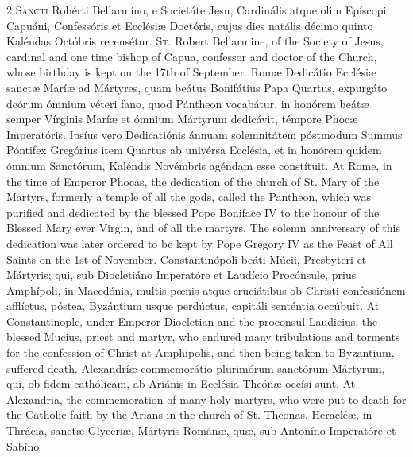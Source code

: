 \begin{paracol}{2}
\lettrine[lines=2]{S}{ancti} Robérti 
 Bellarmíno, e Societáte Jesu, Cardinális atque olim Epíscopi Capuáni, 
 Confessóris et Ecclésiæ Doctóris, cujus dies natális décimo quinto Kaléndas 
 Octóbris recensétur.
\switchcolumn
{}
\lettrine[lines=2]{S}{t.} Robert Bellarmine, of the 
 Society of Jesus, cardinal and one time bishop of Capua, confessor and 
 doctor of the Church, whose birthday is kept on the 17th of September.
\switchcolumn*
{}
Romæ Dedicátio 
 Ecclésiæ sanctæ Maríæ ad Mártyres, quam beátus Bonifátius Papa Quartus, 
 expurgáto deórum ómnium véteri fano, quod Pántheon vocabátur, in honórem 
 beátæ semper Vírginis Maríæ et ómnium Mártyrum dedicávit, témpore Phocæ 
 Imperatóris. Ipsíus vero Dedicatiónis ánnuam solemnitátem póstmodum 
 Summus Póntifex Gregórius item Quartus ab univérsa Ecclésia, et in honórem 
 quidem ómnium Sanctórum, Kaléndis Novémbris agéndam esse constítuit.
\switchcolumn
{}
At Rome, in the time of Emperor 
 Phocas, the dedication of the church of St. Mary of the Martyrs, formerly a 
 temple of all the gods, called the Pantheon, which was purified and 
 dedicated by the blessed Pope Boniface IV to the honour of the Blessed Mary 
 ever Virgin, and of all the martyrs. The solemn anniversary of this 
 dedication was later ordered to be kept by Pope Gregory IV as the Feast of 
 All Saints on the 1st of November.
\switchcolumn*
{}
Constantinópoli beáti 
 Múcii, Presbyteri et Mártyris; qui, sub Diocletiáno Imperatóre et Laudício 
 Procónsule, prius Amphípoli, in Macedónia, multis pœnis atque cruciátibus ob 
 Christi confessiónem afflíctus, póstea, Byzántium usque perdúctus, capitáli 
 senténtia occúbuit.
\switchcolumn
{}
At Constantinople, under Emperor 
 Diocletian and the proconsul Laudicius, the blessed Mucius, priest and 
 martyr, who endured many tribulations and torments for the confession of 
 Christ at Amphipolis, and then being taken to Byzantium, suffered death.
\switchcolumn*
{}
Alexandríæ 
 commemorátio plurimórum sanctórum Mártyrum, qui, ob fidem cathólicam, ab 
 Ariánis in Ecclésia Theónæ occísi sunt.
\switchcolumn
{}
At Alexandria, the commemoration of 
 many holy martyrs, who were put to death for the Catholic faith by the 
 Arians in the church of St. Theonas.
\switchcolumn*
{}
Heracléæ, in Thrácia, 
 sanctæ Glycériæ, Mártyris Románæ, quæ, sub Antoníno Imperatóre et Sabíno 

\end{paracol}
